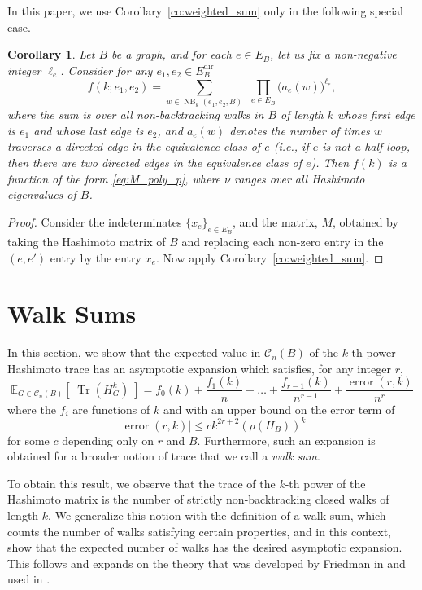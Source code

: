 \documentclass{memo-l}
\theoremstyle{plain}
\newtheorem{corollary}[theorem]{Corollary}
\theoremstyle{definition}
\numberwithin{section}{chapter}
\numberwithin{equation}{chapter}
\newcommand{\expect}[2]{{\mathbb{E}}_{#1}{\left[\; #2\; \right]}}
\DeclareMathOperator{\error}{error}
\DeclareMathOperator{\Tr}{Tr}
\DeclareMathOperator{\NB}{NB}
\newcommand{\Edir}{E^{\mathrm{dir}}}
\theoremstyle{plain}
\theoremstyle{definition}
\newcommand\cC{\mathcal{C}}
\begin{document}
In this paper, we use Corollary~\ref{co:weighted_sum} only in the following
special case.

\begin{corollary}\label{co:count_occurrences}
Let $B$ be a graph, and for each $e\in E_B$, let us fix a non-negative
integer $\ell_e$.  Consider for any $e_1,e_2\in \Edir_B$
$$
f(k;e_1,e_2) = \sum_{w\in \NB_k(e_1,e_2,B)} \ \  \prod_{e\in E_B}
\bigl( a_e(w)\bigr)^{\ell_e} ,
$$
where the sum is over all non-backtracking walks in 
$B$ of length $k$ whose first edge is $e_1$ and whose last edge
is $e_2$, and $a_e(w)$ denotes the number of times $w$ traverses
a directed
edge in the equivalence class of $e$ (i.e., if $e$ is not a half-loop,
then there are two directed edges in the equivalence class of $e$).
Then $f(k)$ is a function of the form \eqref{eq:M_poly_p}, where
$\nu$ ranges over all Hashimoto eigenvalues of $B$.
\end{corollary}
\begin{proof}
Consider the indeterminates $\{x_e\}_{e\in E_B}$,
and the matrix, $M$, obtained by
taking the Hashimoto matrix of $B$ and replacing each non-zero entry
in the $(e,e')$ entry 
by the entry $x_e$.
Now apply Corollary~\ref{co:weighted_sum}.
\end{proof}


\section{Walk Sums}
\label{se:p1-walk-sums}

In this section, we show that the expected value in $\cC_n(B)$ of the
$k$-th power
Hashimoto trace has an 
\gls{asymptotic expansion} which
satisfies, for any integer \( r \), 
\[ 
\expect{G\in\cC_n(B)}{  \Tr(H_G^k) } = f_0(k) +
\frac{f_1(k)}{n} + \ldots + \frac{f_{r-1}(k)}{n^{r-1}} +
\frac{\error(r,k)}{n^r} \] where the \( f_i \) are functions of \(k\) and
with an upper bound on the error term of \[ | \error(r,k) | \leq ck^{2r+2}
(\rho(H_B))^k \] 
for some $c$ depending only on $r$ and $B$.
Furthermore, such an expansion is obtained for a broader notion
of trace that we call a \emph{walk sum}.

To obtain this result, we observe that the trace of the  
$k$-th
power of the Hashimoto matrix is the number of strictly non-backtracking
closed walks of length \(k\). We generalize this notion with the definition
of a walk sum, which counts the number of walks satisfying certain
properties, and in this context, show that the expected number of walks has
the desired asymptotic expansion. This follows and expands on the theory
that was developed by Friedman in \cite{friedman_random_graphs} and used in
\cite{friedman_alon}.
\end{document}
